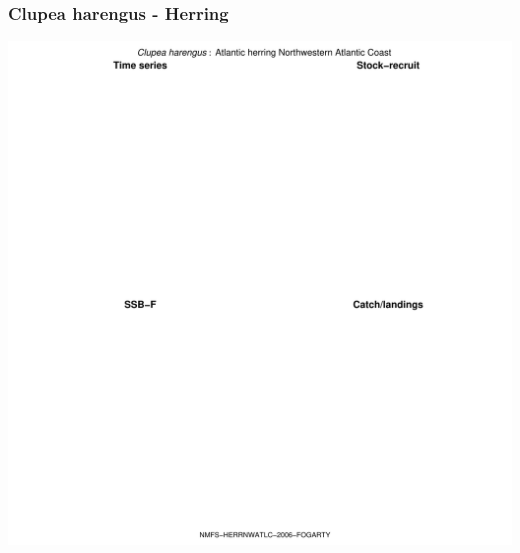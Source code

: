 \subsubsection{Clupea harengus - Herring}
\begin{center}
\includegraphics[width=1.2\textwidth]{../R/figures/NMFS-HERRNWATLC-2006-FOGARTY.pdf}
\end{center}

